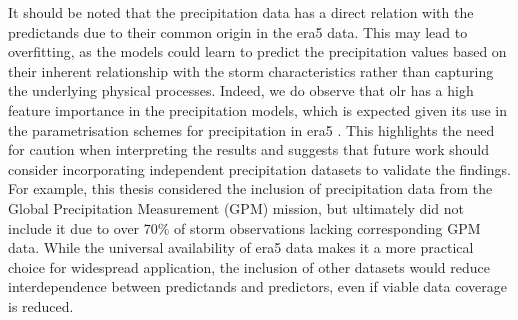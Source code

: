 It should be noted that the precipitation data has a direct relation with the predictands due to their common origin in the \acrshort{era5} data. This may lead to overfitting, as the models could learn to predict the precipitation values based on their inherent relationship with the storm characteristics rather than capturing the underlying physical processes. Indeed, we do observe that \acrshort{olr} has a high feature importance in the precipitation models, which is expected given its use in the parametrisation schemes for precipitation in \acrshort{era5} \citep{Hersbach2020}. This highlights the need for caution when interpreting the results and suggests that future work should consider incorporating independent precipitation datasets to validate the findings. For example, this thesis considered the inclusion of precipitation data from the Global Precipitation Measurement (GPM) mission, but ultimately did not include it due to over 70\% of storm observations lacking corresponding GPM data. While the universal availability of \acrshort{era5} data makes it a more practical choice for widespread application, the inclusion of other datasets would reduce interdependence between predictands and predictors, even if viable data coverage is reduced.